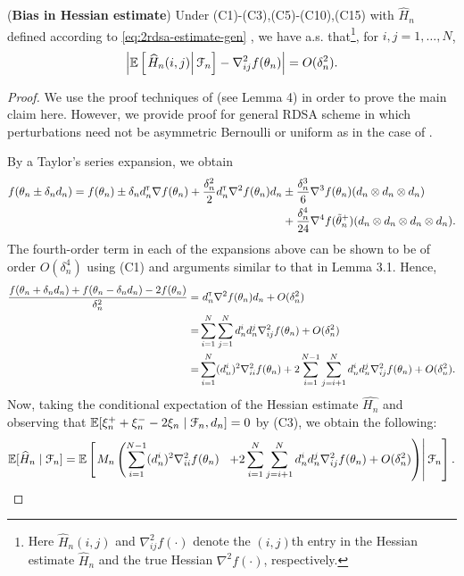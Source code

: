 \begin{lemma}(\textbf{Bias in Hessian estimate})
\label{lemma:2rdsa-bias}
Under (C1)-(C3),(C5)-(C10),(C15) with $\widehat H_n$ defined according to \eqref{eq:2rdsa-estimate-gen} , we have a.s. that\footnote{Here $\widehat H_n(i,j)$ and $\nabla^2_{ij}f(\cdot)$ denote the $(i,j)$th entry in the Hessian estimate $\widehat H_n$ and the true Hessian $\nabla^2 f(\cdot)$, respectively.}, for $i,j = 1,\ldots,N$,
\begin{align}
\left|\mathbb{E}\left[
\left. \widehat H_n(i,j) \right| \mathcal{F}_n \right] - \nabla^2_{ij} f(\theta_n)\right| = O(\delta_n^2).
\end{align} 
\end{lemma}
\begin{proof}
We use the proof techniques of \cite{prashanth2015rdsa} (see Lemma 4) in order to prove the main claim here. However, we provide proof for general RDSA scheme in which perturbations need not be asymmetric Bernoulli or uniform as in the case of \cite{prashanth2015rdsa}.

By a Taylor's series expansion, we obtain
\begin{align*}
f(\theta_n \pm \delta_n d_n) = f(\theta_n) \pm \delta_n d_n^\mathsf{\scriptscriptstyle T} \nabla f(\theta_n) + \frac{\delta_n^2}{2} d_n^\mathsf{\scriptscriptstyle T} \nabla^2 f(\theta_n) d_n &\pm \frac{\delta_n^3}{6} \nabla^3 f(\theta_n) (d_n \otimes d_n \otimes d_n) \\
 & +  \frac{\delta_n^4}{24} \nabla^4 f(\tilde  \theta_n^+)(d_n \otimes d_n \otimes d_n \otimes d_n).
\end{align*}
The fourth-order term in each of the expansions above can be shown to be of order $O(\delta_n^4)$ using (C1) and arguments similar to that in Lemma 3.1. Hence,
\begin{align*}
\dfrac{f(\theta_n+\delta_n d_n) + f(\theta_n-\delta_n d_n) - 2 f(\theta_n)}{\delta_n^2}
 = &\,\, d_n^\mathsf{\scriptscriptstyle T} \nabla^2 f(\theta_n) d_n +  O(\delta_n^2)\\
= & \sum\limits_{i=1}^N\sum\limits_{j=1}^N d_n^i d_n^j \nabla^2_{ij} f(\theta_n) + O(\delta_n^2)\\
= & \sum\limits_{i=1}^N (d_n^i)^2 \nabla^2_{ii} f(\theta_n) + 2\sum\limits_{i=1}^{N-1}\sum\limits_{j=i+1}^N d_n^i d_n^j \nabla^2_{ij} f(\theta_n) + O(\delta_n^2).
\end{align*}
Now, taking the conditional expectation of the Hessian estimate $\widehat{H_n}$ and observing that $\mathbb{E}[\xi_n^+ + \xi_n^- - 2\xi_n \mid \mathcal{F}_n, d_n] = 0$ by (C3), we obtain the following:
\begin{align}
\mathbb{E}[\widehat H_n \mid \mathcal{F}_n] =  \mathbb{E}\left[\left. M_n \left(\sum\limits_{i=1}^{N-1} (d_n^i)^2 \nabla^2_{ii} f(\theta_n) \right.\right.\right.\left.\left.\left.+ 2\sum\limits_{i=1}^N\sum\limits_{j=i+1}^N d_n^i d_n^j \nabla^2_{ij} f(\theta_n) + O(\delta_n^2)\right)\right| \mathcal{F}_n\right]. \label{eq:h1}
\end{align}


\end{proof}
